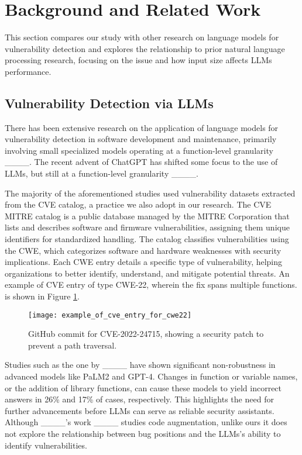 \section{Background and Related Work}
\label{sec:related_work} \label{sec:background}
	
	This section compares our study with other research on language models for vulnerability detection and explores the relationship to prior natural language processing research, focusing on the  issue and how input size affects \acp{LLM} performance.
	
	\subsection{Vulnerability Detection via LLMs} \label{sec:related_work:bug_detection} \label{sec:background:cwe_n_cve}
	
	There has been extensive research on the application of language models for vulnerability detection in software development and maintenance, primarily involving small specialized models operating at a function-level granularity ____. The recent advent of ChatGPT has shifted some focus to the use of \acp{LLM}, but still at a function-level granularity ____.
	
	The majority of the aforementioned studies used vulnerability datasets extracted from the \ac{CVE} catalog, a practice we also adopt in our research.
	The \ac{CVE} MITRE catalog is a public database managed by the MITRE Corporation that lists and describes software and firmware vulnerabilities, assigning them unique identifiers for standardized handling. The catalog classifies vulnerabilities using the \acl{CWE}, which categorizes software and hardware weaknesses with security implications. Each \ac{CWE} entry details a specific type of vulnerability, helping organizations to better identify, understand, and mitigate potential threats. An example of \ac{CVE} entry of type CWE-22, wherein the fix spans multiple functions. is shown in Figure \ref{fig:cve_fix}.
	
	\begin{figure}[tbh]
		\centering
		\texttt{[image: example\_of\_cve\_entry\_for\_cwe22]}
		\caption{GitHub commit for CVE-2022-24715, showing a security patch to prevent a path traversal.}
		\label{fig:cve_fix}
	\end{figure}
	
	Studies such as the one by ____ have shown significant non-robustness in advanced models like PaLM2 and GPT-4. Changes in function or variable names, or the addition of library functions, can cause these models to yield incorrect answers in 26\% and 17\% of cases, respectively. This highlights the need for further advancements before \acp{LLM} can serve as reliable security assistants. Although ____'s work ____ studies code augmentation, unlike ours it does not explore the relationship between bug positions and the \acp{LLM}'s ability to identify vulnerabilities.
	
